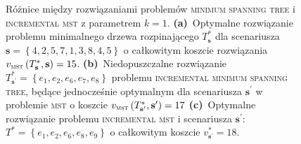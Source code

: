 \begin{figure}[!htbp]
\begin{subfigure}[b]{0.3\textwidth}
		\caption{}
		\label{fig:increxample:c}
	\end{subfigure}
	\hfill\null
	\caption{
		Różnice między rozwiązaniami problemów \textsc{minimum spanning tree} i \textsc{incremental mst} z parametrem $k = 1$.
		\textbf{(a)}~Optymalne rozwiązanie problemu minimalnego drzewa rozpinającego $T^{\ast}_{\textbf{s}}$ dla scenariusza $\textbf{s} = \left\{ 4, 2, 5, 7, 1, 3, 8, 4, 5 \right\}$ o całkowitym koszcie rozwiązania $v_{\textsc{mst}} \left( T^{\ast}_{\textbf{s}}, \textbf{s} \right) = 15$.	
		\textbf{(b)}~Niedopuszczalne rozwiązanie $T^{\ast}_{\textbf{s}^{\prime}} = \left\{ e_{1}, e_{2}, e_{6}, e_{7}, e_{8} \right\}$ problemu \textsc{incremental minimum spanning tree}, będące jednocześnie optymalnym dla scenariusza $\textbf{s}^{\prime}$ w problemie \textsc{mst} o koszcie $v_{\textsc{mst}} \left( T^{\ast}_{\textbf{s}^{\prime}}, \textbf{s}^{\prime} \right) = 17$
		\textbf{(c)}~Optymalne rozwiązanie problemu \textsc{incremental mst} i scenariusza $\textbf{s}^{\prime}$: $T^{\ast} = \left\{ e_{1}, e_{2}, e_{6}, e_{8}, e_{9} \right\}$ o całkowitym koszcie $v^{\ast}_{\textbf{s}^{\prime}} = 18$.
	}
	\label{fig:increxample}
\end{figure}
